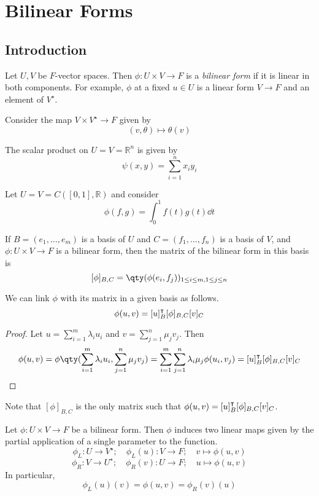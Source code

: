 \section{Bilinear Forms}
\subsection{Introduction}
\begin{definition}
	Let $U, V$ be $F$-vector spaces.
	Then $\phi \colon U \times V \to F$ is a \textit{bilinear form} if it is linear in both components.
	For example, $\phi$ at a fixed $u \in U$ is a linear form $V \to F$ and an element of $V^\star$.
\end{definition}
\begin{example}
	Consider the map $V \times V^\star \to F$ given by
	\[
		(v, \theta) \mapsto \theta(v)
	\]
\end{example}
\begin{example}
	The scalar product on $U = V = \mathbb R^n$ is given by
	\[
		\psi(x, y) = \sum_{i=1}^n x_i y_i
	\]
\end{example}
\begin{example}
	Let $U = V = C([0,1], \mathbb R)$ and consider
	\[
		\phi(f,g) = \int_0^1 f(t)g(t) \dd{t}
	\]
\end{example}
\begin{definition}
	If $B = (e_1, \dots, e_m)$ is a basis of $U$ and $C = (f_1, \dots, f_n)$ is a basis of $V$, and $\phi \colon U \times V \to F$ is a bilinear form, then the matrix of the bilinear form in this basis is
	\[
		[\phi]_{B, C} = \qty( \phi(e_i, f_j) )_{1 \leq i \leq m, 1 \leq j \leq n}
	\]
\end{definition}
\begin{lemma}
	We can link $\phi$ with its matrix in a given basis as follows.
	\[
		\phi(u,v) = [u]_B^\intercal [\phi]_{B, C} [v]_C
	\]
\end{lemma}
\begin{proof}
	Let $u = \sum_{i=1}^m \lambda_i u_i$ and $v = \sum_{j=1}^n \mu_j v_j$.
	Then
	\[
		\phi(u,v) = \phi\qty( \sum_{i=1}^m \lambda_i u_i, \sum_{j=1}^n \mu_j v_j ) = \sum_{i=1}^m \sum_{j=1}^n \lambda_i \mu_j \phi(u_i, v_j) = [u]_B^\transpose [\phi]_{B,C} [v]_C
	\]
\end{proof}
\begin{remark}
	Note that $[\phi]_{B,C}$ is the only matrix such that $\phi(u,v) = [u]_B^\intercal [\phi]_{B, C} [v]_C$.
\end{remark}
\begin{definition}
	Let $\phi \colon U \times V \to F$ be a bilinear form.
	Then $\phi$ induces two linear maps given by the partial application of a single parameter to the function.
	\[
		\phi_L \colon U \to V^\star;\quad \phi_L(u) \colon V \to F;\quad v \mapsto \phi(u,v)
	\]
	\[
		\phi_R \colon V \to U^\star;\quad \phi_R(v) \colon U \to F;\quad u \mapsto \phi(u,v)
	\]
	In particular,
	\[
		\phi_L(u)(v) = \phi(u,v) = \phi_R(v)(u)
	\]
\end{definition}
